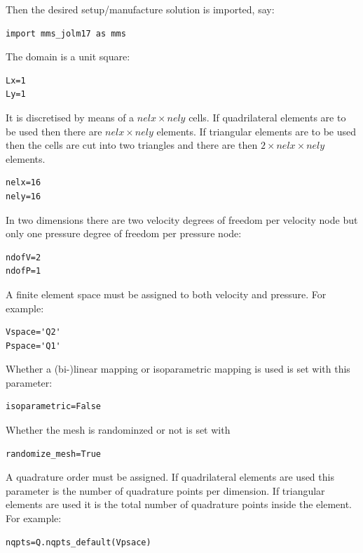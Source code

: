 Then the desired setup/manufacture solution is imported, say:
\begin{lstlisting}
import mms_jolm17 as mms
\end{lstlisting}


The domain is a unit square:
\begin{lstlisting}
Lx=1
Ly=1
\end{lstlisting}

It is discretised by means of a $nelx\times nely$ cells. If quadrilateral 
elements are to be used then there are $nelx\times nely$ elements. If 
triangular elements are to be used then the cells are cut into two 
triangles and there are then $2\times nelx\times nely$ elements.

\begin{lstlisting}
nelx=16
nely=16
\end{lstlisting}


In two dimensions there are two velocity degrees of freedom per 
velocity node but only one pressure degree of freedom per pressure node:
\begin{lstlisting}
ndofV=2
ndofP=1
\end{lstlisting}

A finite element space must be assigned to both velocity and pressure. For example: 
\begin{lstlisting}
Vspace='Q2'
Pspace='Q1'
\end{lstlisting}

Whether a (bi-)linear mapping or isoparametric mapping is used is set with 
this parameter:
\begin{lstlisting}
isoparametric=False
\end{lstlisting}

Whether the mesh is randominzed or not is set with 
\begin{lstlisting}
randomize_mesh=True
\end{lstlisting}


A quadrature order must be assigned. If quadrilateral elements are used
this parameter is the number of quadrature points per dimension. 
If triangular elements are used it is the total number of quadrature points 
inside the element. For example: 
\begin{lstlisting}
nqpts=Q.nqpts_default(Vpsace)
\end{lstlisting}

